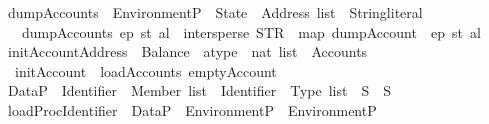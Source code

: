\begin{isabellebody}
\isanewline
{}\isamarkupfalse%
\ dump\isactrlsub A\isactrlsub c\isactrlsub c\isactrlsub o\isactrlsub u\isactrlsub n\isactrlsub t\isactrlsub s\ {\isacharcolon}{\kern0pt}{\isacharcolon}{\kern0pt}\ {\isachardoublequoteopen}Environment\isactrlsub P\ {\isasymRightarrow}\ State\ {\isasymRightarrow}\ Address\ list\ {\isasymRightarrow}\ String{\isachardot}{\kern0pt}literal{\isachardoublequoteclose}\isanewline
\ \ \ {\isachardoublequoteopen}dump\isactrlsub A\isactrlsub c\isactrlsub c\isactrlsub o\isactrlsub u\isactrlsub n\isactrlsub t\isactrlsub s\ ep\ st\ al\ {\isacharequal}{\kern0pt}\ intersperse\ {\isacharparenleft}{\kern0pt}STR\ {\isacharprime}{\kern0pt}{\isacharprime}{\kern0pt}{\isasymnewline}{\isacharprime}{\kern0pt}{\isacharprime}{\kern0pt}{\isacharparenright}{\kern0pt}\ {\isacharparenleft}{\kern0pt}map\ {\isacharparenleft}{\kern0pt}dump\isactrlsub A\isactrlsub c\isactrlsub c\isactrlsub o\isactrlsub u\isactrlsub n\isactrlsub t\ {}{}{}{}\ ep\ st{\isacharparenright}{\kern0pt}\ al{\isacharparenright}{\kern0pt}{\isachardoublequoteclose}\isanewline
\isanewline
{}\isamarkupfalse%
\ init\isactrlsub A\isactrlsub c\isactrlsub c\isactrlsub o\isactrlsub u\isactrlsub n\isactrlsub t{\isacharcolon}{\kern0pt}{\isacharcolon}{\kern0pt}{\isachardoublequoteopen}{\isacharparenleft}{\kern0pt}Address\ {\isasymtimes}\ Balance\ {\isasymtimes}\ atype\ {\isasymtimes}\ nat{\isacharparenright}{\kern0pt}\ list\ {\isacharequal}{\kern0pt}{\isachargreater}{\kern0pt}\ Accounts{\isachardoublequoteclose}\ \ \isanewline
\ \ {\isachardoublequoteopen}init\isactrlsub A\isactrlsub c\isactrlsub c\isactrlsub o\isactrlsub u\isactrlsub n\isactrlsub t\ {\isacharequal}{\kern0pt}\ load\isactrlsub A\isactrlsub c\isactrlsub c\isactrlsub o\isactrlsub u\isactrlsub n\isactrlsub t\isactrlsub s\ emptyAccount{\isachardoublequoteclose}\isanewline
\isanewline
{}\isamarkupfalse%
\ Data\isactrlsub P\ {\isacharequal}{\kern0pt}\ {\isachardoublequoteopen}{\isacharparenleft}{\kern0pt}Identifier\ {\isasymtimes}\ Member{\isacharparenright}{\kern0pt}\ list\ {\isasymtimes}\ {\isacharparenleft}{\kern0pt}{\isacharparenleft}{\kern0pt}Identifier\ {\isasymtimes}\ Type{\isacharparenright}{\kern0pt}\ list\ {\isasymtimes}\ S{\isacharparenright}{\kern0pt}\ {\isasymtimes}\ S{\isachardoublequoteclose}\isanewline
\isanewline
{}\isamarkupfalse%
\ loadProc{\isacharcolon}{\kern0pt}{\isacharcolon}{\kern0pt}{\isachardoublequoteopen}Identifier\ {\isasymRightarrow}\ Data\isactrlsub P\ {\isasymRightarrow}\ Environment\isactrlsub P\ {\isasymRightarrow}\ Environment\isactrlsub P{\isachardoublequoteclose}\isanewline

\end{isabellebody}
